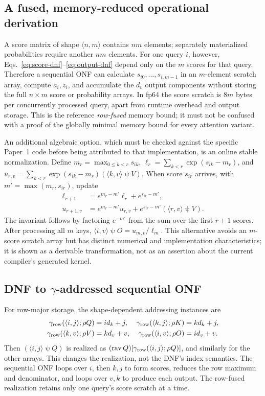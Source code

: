 \documentclass[11pt]{article}
\newcommand{\psisel}{\mathbin{\psi}}
\begin{document}
\subsection{A fused, memory-reduced operational derivation}
A score matrix of shape $\langle n,m\rangle$ contains $nm$ elements; separately materialized probabilities require another $nm$ elements. For one query $i$, however, Eqs.~\eqref{eq:score-dnf}--\eqref{eq:output-dnf} depend only on the $m$ scores for that query. Therefore a sequential ONF can calculate $s_{i0},\ldots,s_{i,m-1}$ in an $m$-element scratch array, compute $a_i,z_i$, and accumulate the $d_v$ output components without storing the full $n\times m$ score or probability arrays. In fp64 the score scratch is $8m$ bytes per concurrently processed query, apart from runtime overhead and output storage. This is the reference \emph{row-fused} memory bound; it must not be confused with a proof of the globally minimal memory bound for every attention variant.

An additional algebraic option, which must be checked against the specific Paper~1 code before being attributed to that implementation, is an online stable normalization. Define $m_r=\max_{0\le k<r}s_{ik}$, $\ell_r=\sum_{k<r}\exp(s_{ik}-m_r)$, and $u_{r,v}=\sum_{k<r}\exp(s_{ik}-m_r)(\langle k,v\rangle\psisel V)$. When score $s_{ir}$ arrives, with $m'=\max(m_r,s_{ir})$, update
\begin{align}
\ell_{r+1}&=e^{m_r-m'}\ell_r+e^{s_{ir}-m'},\\
u_{r+1,v}&=e^{m_r-m'}u_{r,v}+e^{s_{ir}-m'}(\langle r,v\rangle\psisel V).
\end{align}
The invariant follows by factoring $e^{-m'}$ from the sum over the first $r+1$ scores. After processing all $m$ keys, $\langle i,v\rangle\psisel O=u_{m,v}/\ell_m$. This alternative avoids an $m$-score scratch array but has distinct numerical and implementation characteristics; it is shown as a derivable transformation, not as an assertion about the current compiler's generated kernel.

\subsection{DNF to $\gamma$-addressed sequential ONF}
For row-major storage, the shape-dependent addressing instances are
\begin{align}
\gamma_{\rm row}(\langle i,j\rangle;\rho Q)&=i d_k+j, &\gamma_{\rm row}(\langle k,j\rangle;\rho K)&=k d_k+j,\\
\gamma_{\rm row}(\langle k,v\rangle;\rho V)&=k d_v+v, &\gamma_{\rm row}(\langle i,v\rangle;\rho O)&=i d_v+v.
\end{align}
Then $(\langle i,j\rangle\psisel Q)$ is realized as $(\operatorname{rav}Q)[\gamma_{\rm row}(\langle i,j\rangle;\rho Q)]$, and similarly for the other arrays. This changes the realization, not the DNF's index semantics. The sequential ONF loops over $i$, then $k,j$ to form scores, reduces the row maximum and denominator, and loops over $v,k$ to produce each output. The row-fused realization retains only one query's score scratch at a time.
\end{document}
